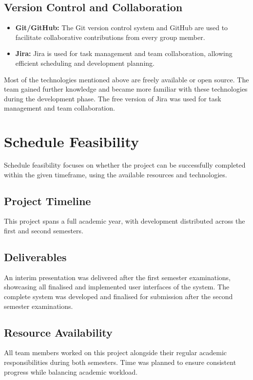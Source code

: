 \documentclass[12pt, a4paper]{report}
\begin{document}
\subsection{Version Control and Collaboration}
\begin{itemize}
    \item \textbf{Git/GitHub:} The Git version control system and GitHub are used to facilitate collaborative contributions from every group member.
    \item \textbf{Jira:} Jira is used for task management and team collaboration, allowing efficient scheduling and development planning.
\end{itemize}

Most of the technologies mentioned above are freely available or open source. The team gained further knowledge and became more familiar with these technologies during the development phase. The free version of Jira was used for task management and team collaboration.

\section{Schedule Feasibility}

Schedule feasibility focuses on whether the project can be successfully completed within the given timeframe, using the available resources and technologies.

\subsection{Project Timeline}
This project spans a full academic year, with development distributed across the first and second semesters.

\subsection{Deliverables}
An interim presentation was delivered after the first semester examinations, showcasing all finalised and implemented user interfaces of the system. The complete system was developed and finalised for submission after the second semester examinations.

\subsection{Resource Availability}
All team members worked on this project alongside their regular academic responsibilities during both semesters. Time was planned to ensure consistent progress while balancing academic workload.
\end{document}
